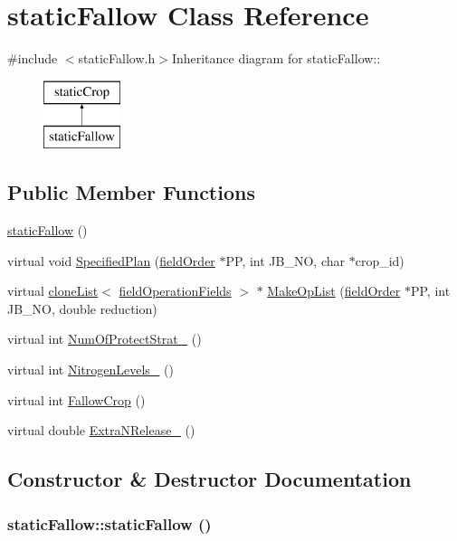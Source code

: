 \hypertarget{classstatic_fallow}{
\section{staticFallow Class Reference}
\label{classstatic_fallow}
}


{\ttfamily \#include $<$staticFallow.h$>$}Inheritance diagram for staticFallow::\begin{figure}[H]
\begin{center}
\leavevmode
\includegraphics[height=2cm]{classstatic_fallow}
\end{center}
\end{figure}
\subsection*{Public Member Functions}
\begin{DoxyCompactItemize}
\item 
\hyperlink{classstatic_fallow_a6cb0af77e38d00532197595583bca35c}{staticFallow} ()
\item 
virtual void \hyperlink{classstatic_fallow_a26c900c35a0962d6779bdb87e8c1aa98}{SpecifiedPlan} (\hyperlink{classfield_order}{fieldOrder} $\ast$PP, int JB\_\-NO, char $\ast$crop\_\-id)
\item 
virtual \hyperlink{classclone_list}{cloneList}$<$ \hyperlink{classfield_operation_fields}{fieldOperationFields} $>$ $\ast$ \hyperlink{classstatic_fallow_a7aae02eeba095d55e80cd0e71217d4d6}{MakeOpList} (\hyperlink{classfield_order}{fieldOrder} $\ast$PP, int JB\_\-NO, double reduction)
\item 
virtual int \hyperlink{classstatic_fallow_a76bf31d045ba244e30de88a7c248d1e4}{NumOfProtectStrat\_\-} ()
\item 
virtual int \hyperlink{classstatic_fallow_a35f2275e8346d89412b542bb335fc2dc}{NitrogenLevels\_\-} ()
\item 
virtual int \hyperlink{classstatic_fallow_a85c882ab7f143ed8fbb4e6a8d2463bfb}{FallowCrop} ()
\item 
virtual double \hyperlink{classstatic_fallow_abcf18f6c7d1ad76d2b0ab04c35f193d9}{ExtraNRelease\_\-} ()
\end{DoxyCompactItemize}


\subsection{Constructor \& Destructor Documentation}
\hypertarget{classstatic_fallow_a6cb0af77e38d00532197595583bca35c}{
\subsubsection[{staticFallow}]{\setlength{\rightskip}{0pt plus 5cm}staticFallow::staticFallow ()}}
\label{classstatic_fallow_a6cb0af77e38d00532197595583bca35c}


